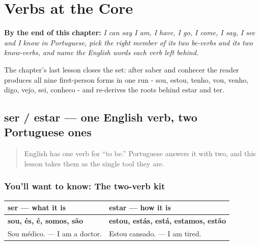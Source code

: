 
\chapter{Verbs at the Core}
\label{ch:pt-core-verbs}

\begin{chapteropening}
\textbf{By the end of this chapter:} \emph{I can say I am, I have, I go, I come, I say, I see and I know in Portuguese, pick the right member of its two be-verbs and its two know-verbs, and name the English words each verb left behind.}

The chapter's last lesson closes the set: after saber and conhecer the reader produces all nine first-person forms in one run - sou, estou, tenho, vou, venho, digo, vejo, sei, conheco - and re-derives the roots behind estar and ter.
\end{chapteropening}

\section[ser / estar]{ser / estar — one English verb, two Portuguese ones}

\label{lesson:PT-C18-ser-estar}



\begin{quote}
English has one verb for \textquotedblleft{}to be.\textquotedblright{} Portuguese answers it with two, and this lesson takes them as the single tool they are.
\end{quote}

\subsection*{You'll want to know: The two-verb kit}
\noindent
\begin{tabularx}{\linewidth}{@{}>{\raggedright\arraybackslash}X>{\raggedright\arraybackslash}X@{}}
\toprule
\textbf{ser — what it is} & \textbf{estar — how it is} \\
\midrule
\textbf{sou, és, é, somos, são} & \textbf{estou, estás, está, estamos, estão} \\
Sou médico. — I am a doctor. & Estou cansado. — I am tired. \\
\bottomrule
\end{tabularx}

